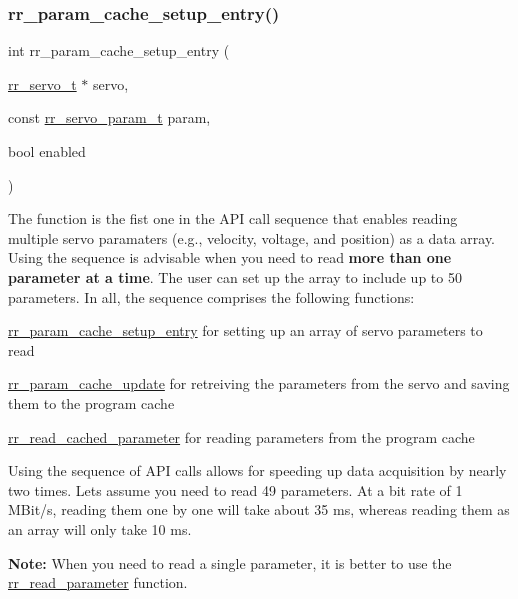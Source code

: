 \subsubsection{\texorpdfstring{rr\+\_\+param\+\_\+cache\+\_\+setup\+\_\+entry()}{rr\_param\_cache\_setup\_entry()}}
{\footnotesize\ttfamily int rr\+\_\+param\+\_\+cache\+\_\+setup\+\_\+entry (\begin{DoxyParamCaption}\item[{\hyperlink{structrr__servo__t}{rr\+\_\+servo\+\_\+t} $\ast$}]{servo,  }\item[{const \hyperlink{api_8h_aa1f58887fab4642cf49f6f453c1d276d}{rr\+\_\+servo\+\_\+param\+\_\+t}}]{param,  }\item[{bool}]{enabled }\end{DoxyParamCaption})}



The function is the fist one in the A\+PI call sequence that enables reading multiple servo paramaters (e.\+g., velocity, voltage, and position) as a data array. Using the sequence is advisable when you need to read {\bfseries more than one parameter at a time}. The user can set up the array to include up to 50 parameters. In all, the sequence comprises the following functions\+: 


\begin{DoxyItemize}
\item \hyperlink{group___realtime_ga770c1e8b4d868cea649592e26a2706dd}{rr\+\_\+param\+\_\+cache\+\_\+setup\+\_\+entry} for setting up an array of servo parameters to read 
\item \hyperlink{group___realtime_ga4d9f2bcfc136357405359c9ca9d4aedf}{rr\+\_\+param\+\_\+cache\+\_\+update} for retreiving the parameters from the servo and saving them to the program cache 
\item \hyperlink{group___realtime_ga9249202a29031f84b7dc3da37db05dfc}{rr\+\_\+read\+\_\+cached\+\_\+parameter} for reading parameters from the program cache
\end{DoxyItemize}Using the sequence of A\+PI calls allows for speeding up data acquisition by nearly two times. Let\textquotesingle{}s assume you need to read 49 parameters. At a bit rate of 1 M\+Bit/s, reading them one by one will take about 35 ms, whereas reading them as an array will only take 10 ms. 

{\bfseries Note\+:} When you need to read a single parameter, it is better to use the \hyperlink{group___realtime_gae665cf9423955f882e94282d66ba6a60}{rr\+\_\+read\+\_\+parameter} function.


